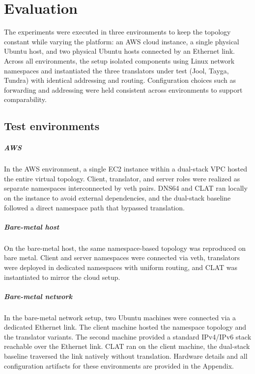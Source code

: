\chapter{Evaluation}
The experiments were executed in three environments to keep the topology constant while varying the platform: an AWS cloud instance, a single physical Ubuntu host, and two physical Ubuntu hosts connected by an Ethernet link. Across all environments, the setup isolated components using Linux network namespaces and instantiated the three translators under test (Jool, Tayga, Tundra) with identical addressing and routing. Configuration choices such as forwarding and addressing were held consistent across environments to support comparability. 

\section{Test environments}
\paragraph{AWS}
In the AWS environment, a single EC2 instance within a dual-stack VPC hosted the entire virtual topology. Client, translator, and server roles were realized as separate namespaces interconnected by veth pairs\cite{veth4}. DNS64 and CLAT ran locally on the instance to avoid external dependencies, and the dual-stack baseline followed a direct namespace path that bypassed translation.

\paragraph{Bare-metal host}
On the bare-metal host, the same namespace-based topology was reproduced on bare metal. Client and server namespaces were connected via veth, translators were deployed in dedicated namespaces with uniform routing, and CLAT was instantiated to mirror the cloud setup. 
\paragraph{Bare-metal network}
In the bare-metal network setup, two Ubuntu machines were connected via a dedicated Ethernet link. The client machine hosted the namespace topology and the translator variants. The second machine provided a standard IPv4/IPv6 stack reachable over the Ethernet link. CLAT ran on the client machine, the dual-stack baseline traversed the link natively without translation. Hardware details and all configuration artifacts for these environments are provided in the Appendix.

